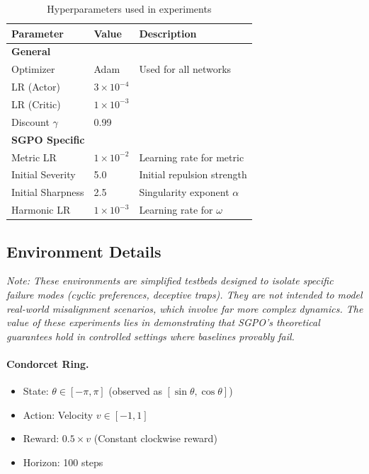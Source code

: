 \begin{table}[H]
\centering
\small
\caption{Hyperparameters used in experiments}
\label{tab:hyperparams}
\begin{tabular}{@{}llp{4cm}@{}}
\toprule
Parameter & Value & Description \\
\midrule
\multicolumn{3}{l}{\textbf{General}} \\
Optimizer & Adam & Used for all networks \\
LR (Actor) & $3 \times 10^{-4}$ & \\
LR (Critic) & $1 \times 10^{-3}$ & \\
Discount $\gamma$ & 0.99 & \\
\midrule
\multicolumn{3}{l}{\textbf{SGPO Specific}} \\
Metric LR & $1 \times 10^{-2}$ & Learning rate for metric \\
Initial Severity & 5.0 & Initial repulsion strength \\
Initial Sharpness & 2.5 & Singularity exponent $\alpha$ \\
Harmonic LR & $1 \times 10^{-3}$ & Learning rate for $\omega$ \\
\bottomrule
\end{tabular}
\end{table}

\subsection{Environment Details}

\textit{Note: These environments are simplified testbeds designed to isolate specific failure modes (cyclic preferences, deceptive traps). They are not intended to model real-world misalignment scenarios, which involve far more complex dynamics. The value of these experiments lies in demonstrating that SGPO's theoretical guarantees hold in controlled settings where baselines provably fail.}

\paragraph{Condorcet Ring.}
\begin{itemize}
    \item State: $\theta \in [-\pi, \pi]$ (observed as $[\sin \theta, \cos \theta]$)
    \item Action: Velocity $v \in [-1, 1]$
    \item Reward: $0.5 \times v$ (Constant clockwise reward)
    \item Horizon: 100 steps
\end{itemize}

